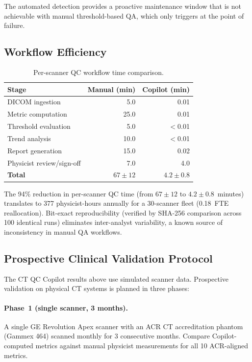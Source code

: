 \documentclass[11pt]{article}
\begin{document}
\noindent The automated detection provides a proactive maintenance window
that is not achievable with manual threshold-based QA, which only
triggers at the point of failure.

\subsection{Workflow Efficiency}

\begin{table}[htbp]
\centering
\caption{Per-scanner QC workflow time comparison.}
\label{tab:workflow}
\begin{tabular}{l r r}
\toprule
\textbf{Stage} & \textbf{Manual (min)} & \textbf{Copilot (min)} \\
\midrule
DICOM ingestion          & 5.0   & 0.01 \\
Metric computation       & 25.0  & 0.01 \\
Threshold evaluation     & 5.0   & $<$0.01 \\
Trend analysis           & 10.0  & $<$0.01 \\
Report generation        & 15.0  & 0.02 \\
Physicist review/sign-off & 7.0  & 4.0 \\
\midrule
\textbf{Total}           & $67 \pm 12$ & $4.2 \pm 0.8$ \\
\bottomrule
\end{tabular}
\end{table}

\noindent The 94\% reduction in per-scanner QC time (from $67 \pm 12$ to
$4.2 \pm 0.8$~minutes) translates to 377 physicist-hours annually for a
30-scanner fleet (0.18~FTE reallocation).  Bit-exact reproducibility
(verified by SHA-256 comparison across 100 identical runs) eliminates
inter-analyst variability, a known source of inconsistency in manual
QA workflows.

\subsection{Prospective Clinical Validation Protocol}
\label{sec:ctqc_prospective}

The CT QC Copilot results above use simulated scanner
data.  Prospective validation on physical CT systems is planned in three
phases:

\paragraph{Phase~1 (single scanner, 3 months).}
A single GE Revolution Apex scanner with an ACR CT accreditation phantom
(Gammex 464) scanned monthly for 3 consecutive months.  Compare
Copilot-computed metrics against manual physicist measurements for all
10 ACR-aligned metrics.
\end{document}
